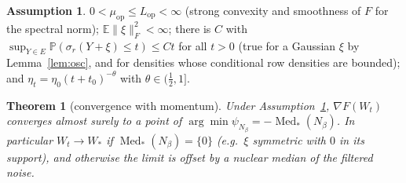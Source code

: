 \documentclass[10pt]{article}
\newtheorem{theorem}{Theorem}
\theoremstyle{definition}
\newtheorem{assumption}{Assumption}
\theoremstyle{remark}
\newcommand{\E}{\mathbb{E}}
\newcommand{\Prob}{\mathbb{P}}
\newcommand{\nF}[1]{\|#1\|_{F}}
\newcommand{\Med}{\operatorname{Med}}
\newcommand{\Lop}{L_{\mathrm{op}}}
\newcommand{\muop}{\mu_{\mathrm{op}}}
\begin{document}
\begin{assumption}\label{ass:M}
$0<\muop\le\Lop<\infty$ (strong convexity and smoothness of $F$ for the spectral norm);
$\E\nF\xi^2<\infty$; there is $C$ with $\sup_{Y\in E}\Prob(\sigma_r(Y+\xi)\le t)\le Ct$ for all $t>0$ (true for a Gaussian
$\xi$ by Lemma~\ref{lem:osc}, and for densities whose conditional row densities are bounded); and
$\eta_t=\eta_0(t+t_0)^{-\theta}$ with $\theta\in(\frac12,1]$.
\end{assumption}

\begin{theorem}[convergence with momentum]\label{thm:momconv}
Under Assumption~\ref{ass:M}, $\nabla F(W_t)$ converges almost surely to a point of
$\arg\min\psi_{N_\beta}=-\Med_\ast(N_\beta)$. In particular $W_t\to W_\ast$ if $\Med_\ast(N_\beta)=\{0\}$ (e.g.\ $\xi$
symmetric with $0$ in its support), and otherwise the limit is offset by a nuclear median of the \emph{filtered} noise.
\end{theorem}
\end{document}
